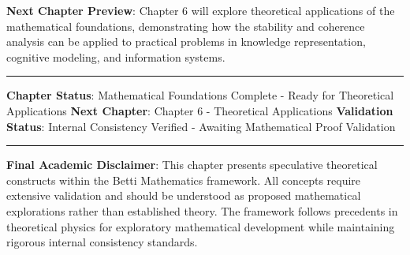 \textbf{Next Chapter Preview}: Chapter 6 will explore theoretical applications of the mathematical foundations, demonstrating how the stability and coherence analysis can be applied to practical problems in knowledge representation, cognitive modeling, and information systems.

\hrule

\textbf{Chapter Status}: Mathematical Foundations Complete - Ready for Theoretical Applications  
\textbf{Next Chapter}: Chapter 6 - Theoretical Applications  
\textbf{Validation Status}: Internal Consistency Verified - Awaiting Mathematical Proof Validation

\hrule

\textbf{Final Academic Disclaimer}: This chapter presents speculative theoretical constructs within the Betti Mathematics framework. All concepts require extensive validation and should be understood as proposed mathematical explorations rather than established theory. The framework follows precedents in theoretical physics for exploratory mathematical development while maintaining rigorous internal consistency standards.